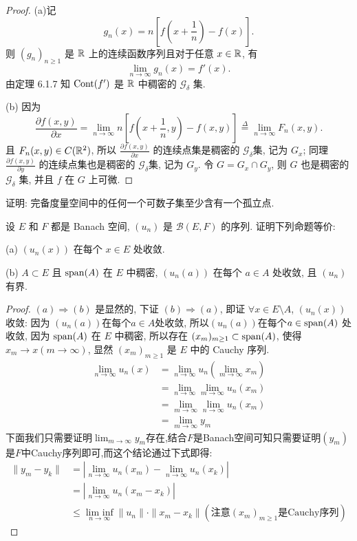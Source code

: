 \begin{proof}
    (a)记
    \[g_n(x)=n\left[f\left(x+\frac{1}{n}\right)-f(x)\right].\]
    则 $(g_n)_{n\geq 1}$ 是 $\mathbb{R}$ 上的连续函数序列且对于任意 $x\in\mathbb{R}$, 有
    \[\lim_{n\to\infty}g_n(x)=f'(x).\]
    由定理 6.1.7 知 $\mathrm{Cont}(f')$ 是 $\mathbb{R}$ 中稠密的 $\mathcal{G}_{\delta}$ 集.

    (b) 因为 
    \[\frac{\partial f(x,y)}{\partial x}=\lim\limits_{n\to\infty}n\left[f\left(x+\frac{1}{n},y\right)-f(x,y)\right]\overset{\Delta}{=}\lim\limits_{n\to\infty}F_n(x,y).\]
    且 $F_n(x,y)\in C(\mathbb{R}^2)$, 所以 $\frac{\partial f(x,y)}{\partial x}$ 
    的连续点集是稠密的 $\mathcal{G}_{\delta}$集, 记为 $G_x$;
    同理 $\frac{\partial f(x,y)}{\partial y}$ 的连续点集也是稠密的 $\mathcal{G}_{\delta}$集,
    记为 $G_y$. 令 $G=G_x\cap G_y$, 则 $G$ 也是稠密的 $\mathcal{G}_{\delta}$ 集, 并且 $f$ 在 $G$ 上可微.
\end{proof}



\begin{exercise}
    证明: 完备度量空间中的任何一个可数子集至少含有一个孤立点.
\end{exercise}




\setcounter{exer}{5}
\begin{exercise}
    设 $E$ 和 $F$ 都是 Banach 空间, $(u_n)$ 是 $\mathcal{B}(E,F)$ 的序列.
    证明下列命题等价:

    (a) $(u_n(x))$ 在每个 $x\in E$ 处收敛.

    (b) $A\subset E$ 且 $\operatorname{span}(A)$ 在 $E$ 中稠密, $(u_n(a))$ 在每个 $a\in A$ 处收敛,
    且 $(u_n)$ 有界.
\end{exercise}

\begin{proof}
    $(a)\Rightarrow(b)$ 是显然的, 下证 $(b)\Rightarrow(a)$,
    即证 $\forall x\in E\setminus A$, $(u_n(x))$ 收敛:
    因为 $(u_n(a))$在每个$a\in A$处收敛, 所以$(u_n(a))$在每个$a\in\operatorname{span}(A)$ 处收敛,
    因为 $\operatorname{span}(A)$ 在 $E$ 中稠密, 所以存在 $(x_m)_{m\geq1}\subset\operatorname{span}(A)$,
    使得 $x_m\to x(m\to\infty)$, 显然 $(x_m)_{m\geq1}$ 是 $E$ 中的 Cauchy 序列. 
    \[\begin{split}
    \lim_{n\to\infty}u_n(x)
    &=\lim_{n\to\infty}u_n\left(\lim_{m\to\infty}x_m\right)\\
    &=\lim_{n\to\infty}\lim_{m\to\infty}u_n(x_m)\\
    &=\lim_{m\to\infty}\lim_{n\to\infty}u_n(x_m)\\
    &=\lim_{m\to\infty}y_m\end{split}\]
    下面我们只需要证明$\lim_{m\to\infty}y_m$存在,结合$F$是Banach空间可知只需要证明$(y_m)$是$F$中Cauchy序列即可,而这个结论通过下式即得:
    \[\begin{split}
    \|y_m-y_k\|
    &=|\lim_{n\to\infty}u_n(x_m)-\lim_{n\to\infty}u_n(x_k)|\\
    &=|\lim_{n\to\infty}u_n(x_m-x_k)|\\
    &\leq\mathop{\textrm{lim inf}}\limits_{n\to\infty}\|u_n\|\cdot\|x_m-x_k\|\left(\mbox{注意}(x_m)_{m\geq1}\mbox{是}\mathrm{Cauchy}\mbox{序列}\right)
    \end{split}\]
\end{proof}



